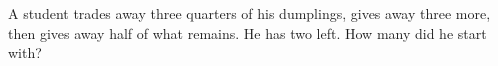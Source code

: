 A student trades away three quarters of his dumplings, gives away three more, then gives away half of what remains. He has two left. How many did he start with?
